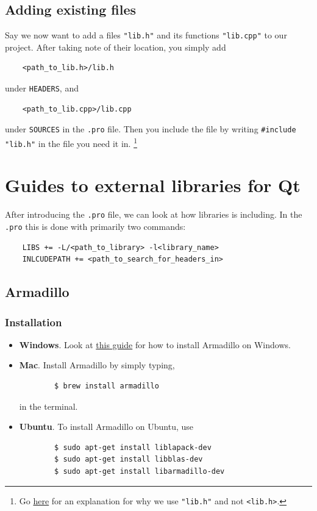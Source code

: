 \documentclass[11pt]{article}
\begin{document}
\subsection{Adding existing files}
Say we now want to add a files \texttt{"lib.h"} and its functions \texttt{"lib.cpp"} to our project. After taking note of their location, you simply add
\begin{lstlisting}
    <path_to_lib.h>/lib.h
\end{lstlisting}
under \texttt{HEADERS}, and 
\begin{lstlisting}
    <path_to_lib.cpp>/lib.cpp
\end{lstlisting}
under \texttt{SOURCES} in the \texttt{.pro} file. Then you include the file by writing \texttt{\#include "lib.h"} in the file you need it in. \footnote{Go \href{https://stackoverflow.com/questions/21593/what-is-the-difference-between-include-filename-and-include-filename}{here} for an explanation for why we use \texttt{"lib.h"} and not \texttt{<lib.h>}.}

\section{Guides to external libraries for Qt}
After introducing the \texttt{.pro} file, we can look at how libraries is including. In the \texttt{.pro} this is done with primarily two commands:
\begin{lstlisting}
    LIBS += -L/<path_to_library> -l<library_name>
    INLCUDEPATH += <path_to_search_for_headers_in>
\end{lstlisting}

\subsection{Armadillo}
\subsubsection{Installation}
\begin{itemize}
    \item \textbf{Windows}. Look at \href{https://d1b10bmlvqabco.cloudfront.net/attach/j6owewp05ym46p/i8xgc5x4yhoyo/j7ayyo45oocq/blas_lapack_solution_windows.pdf}{this guide} for how to install Armadillo on Windows.
    \item \textbf{Mac}. Install Armadillo by simply typing,
    \begin{lstlisting}
        $ brew install armadillo
    \end{lstlisting}
    in the terminal.
    \item \textbf{Ubuntu}. To install Armadillo on Ubuntu, use
    \begin{lstlisting}
        $ sudo apt-get install liblapack-dev
        $ sudo apt-get install libblas-dev
        $ sudo apt-get install libarmadillo-dev
    \end{lstlisting}
\end{itemize}
\end{document}
